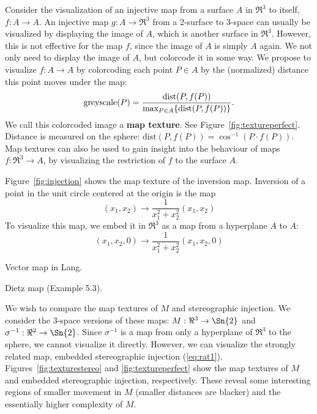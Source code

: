 Consider the visualization of an injective %
map from a surface $A$ in $\Re^3$ to itself, $f: A \rightarrow A$.
An injective map $g:A \rightarrow \Re^3$ from a 2-surface to 3-space
can usually be visualized
by displaying the image of $A$, which is another surface in $\Re^3$.
However, this is not effective for the map $f$, since the image of $A$
is simply $A$ again.
We not only need to display the image of $A$, but colorcode it in some way.
We propose to visualize $f:A \rightarrow A$ by colorcoding each point $P \in A$
by the (normalized) distance this point moves under the map:
\[
\mbox{greyscale}(P) = \frac{\mbox{dist}(P,f(P))}{\mbox{max}_{\footnotesize{P \in A}} 
				\{ \mbox{dist}(P,f(P))\}}.
\]
We call this colorcoded image a {\bf map texture}.
See Figure~\ref{fig:textureperfect}.
Distance is measured on the sphere: $\mbox{dist}(P,f(P)) = \cos^{-1}(P \cdot f(P))$.
Map textures can also be used to gain insight into
the behaviour of maps $f:\Re^{3} \rightarrow A$, by visualizing
the restriction of $f$ to the surface $A$.

\ifFull
\begin{example}
Figure~\ref{fig:injection} shows the map texture of the inversion map.
Inversion of a point in the unit circle centered at the origin
is the map \cite{jjnewintalg}
\[
(x_1,x_2) \rightarrow \frac{1}{x_1^2 + x_2^2}(x_1,x_2)
\]
To visualize this map, we embed it in $\Re^3$ as a map from a hyperplane $A$ to $A$:
\[
(x_1,x_2,0) \rightarrow \frac{1}{x_1^2 + x_2^2}(x_1,x_2,0)
\] 
\end{example}
\begin{example}
Vector map in Lang.
\end{example}
\begin{example}
Dietz map (Example 5.3).
\end{example}
\fi

We wish to compare the map textures of $M$ and stereographic injection.
We consider the 3-space versions of these maps:
$M: \Re^3 \rightarrow \Sn{2}$ and $\sigma^{-1}:\Re^2 \rightarrow \Sn{2}$.
Since $\sigma^{-1}$ is a map from only a hyperplane of $\Re^3$ to the sphere,
we cannot visualize it directly.
However, we can visualize the strongly related map,
embedded stereographic injection (\ref{eq:rat1}).
Figures~\ref{fig:texturestereo} and \ref{fig:textureperfect} show the 
map textures of $M$ and embedded stereographic injection, respectively.
These reveal some interesting regions of smaller movement in $M$
(smaller distances are blacker)
and the essentially higher complexity of $M$.

